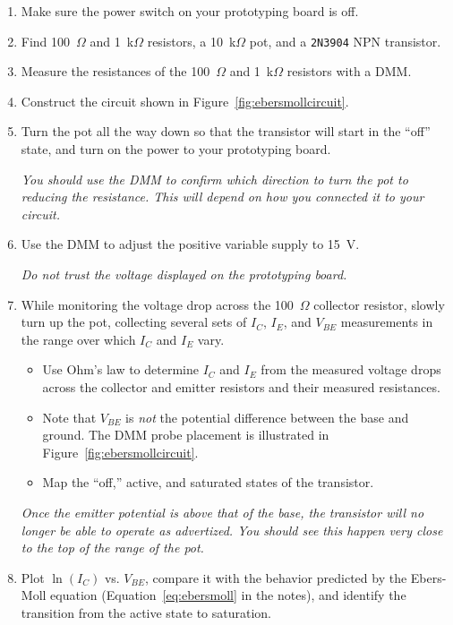 \documentclass[11pt]{article}
\begin{document}
\begin{enumerate}
\item Make sure the power switch on your prototyping board is off.

\item Find 100~$\Omega$ and 1~k$\Omega$ resistors, a 10~k$\Omega$ pot,
  and a \texttt{2N3904} NPN transistor.

\item Measure the resistances of the 100~$\Omega$ and 1~k$\Omega$
  resistors with a DMM.
  
\item Construct the circuit shown in
  Figure~\ref{fig:ebersmollcircuit}. 

\item Turn the pot all the way down so that the transistor will start in the
  ``off'' state, and turn on the power to your prototyping
  board.

  \emph{You should use the DMM to confirm which direction to turn
  the pot to reducing the resistance. This will depend on how you
  connected it to your circuit.}

\item Use the DMM to adjust the positive variable supply to 15~V.

  \emph{Do not trust the voltage displayed on the prototyping board.}

\item While monitoring the voltage drop across the 100~$\Omega$
  collector resistor, slowly turn up the pot, collecting several sets
  of $I_C$, $I_E$, and $V_{BE}$ measurements in the range over which
  $I_C$ and $I_E$ vary.
  \begin{itemize}
  \item Use Ohm's law to determine $I_C$ and $I_E$ from the measured
    voltage drops across the collector and emitter resistors and their
    measured resistances.
  \item Note that $V_{BE}$ is \emph{not} the potential difference
    between the base and ground. The DMM probe placement is
    illustrated in Figure~\ref{fig:ebersmollcircuit}.
  \item Map the ``off,'' active, and saturated states of the
    transistor.
  \end{itemize}
  \emph{Once the emitter potential is above that of the base, the
    transistor will no longer be able to operate as advertized. You
    should see this happen very close to the top of the range of the
    pot.}

\item Plot $\ln(I_C)$ vs. $V_{BE}$, compare it with the behavior
  predicted by the Ebers-Moll equation (Equation~\ref{eq:ebersmoll} in
  the notes), and identify the transition from the active state to
  saturation.


\end{enumerate}
\end{document}

